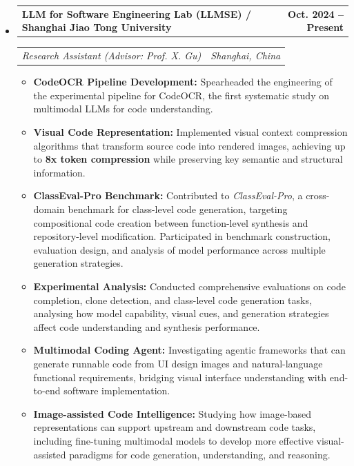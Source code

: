 \documentclass[11pt,letterpaper]{article}
\makeatletter
\newcommand{\headerrow}[2]
{\begin{tabular*}{\linewidth}{l@{\extracolsep{\fill}}r}
#1 &
#2 \\
\end{tabular*}}
\makeatother
\begin{document}
\begin{itemize}
    \item 
    \headerrow
    {\textbf{LLM for Software Engineering Lab (LLMSE) / Shanghai Jiao Tong University}}
    {\textbf{Oct. 2024 -- Present}} 
    \headerrow
    {\emph{Research Assistant (Advisor: Prof. X. Gu)}}
    {\emph{Shanghai, China}}
    \begin{itemize}
        \item \textbf{CodeOCR Pipeline Development:} Spearheaded the engineering of the experimental pipeline for CodeOCR, the first systematic study on multimodal LLMs for code understanding.
        \item \textbf{Visual Code Representation:} Implemented visual context compression algorithms that transform source code into rendered images, achieving up to \textbf{8x token compression} while preserving key semantic and structural information.
        \item \textbf{ClassEval-Pro Benchmark:} Contributed to \emph{ClassEval-Pro}, a cross-domain benchmark for class-level code generation, targeting compositional code creation between function-level synthesis and repository-level modification. Participated in benchmark construction, evaluation design, and analysis of model performance across multiple generation strategies.
        \item \textbf{Experimental Analysis:} Conducted comprehensive evaluations on code completion, clone detection, and class-level code generation tasks, analysing how model capability, visual cues, and generation strategies affect code understanding and synthesis performance.
        \item \textbf{Multimodal Coding Agent:} Investigating agentic frameworks that can generate runnable code from UI design images and natural-language functional requirements, bridging visual interface understanding with end-to-end software implementation.
        \item \textbf{Image-assisted Code Intelligence:} Studying how image-based representations can support upstream and downstream code tasks, including fine-tuning multimodal models to develop more effective visual-assisted paradigms for code generation, understanding, and reasoning.
    \end{itemize}
    
    \vspace{8pt}
    

\end{itemize}
\end{document}
